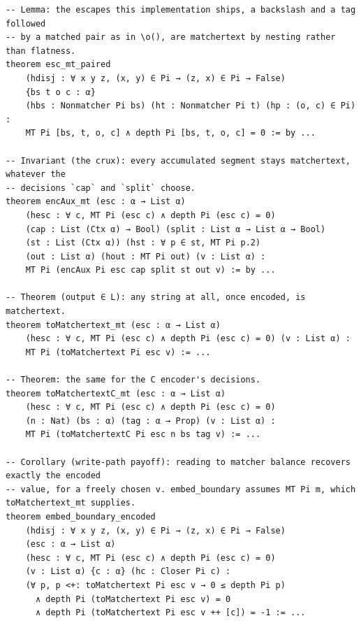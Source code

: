 \begin{lstlisting}
-- Lemma: the escapes this implementation ships, a backslash and a tag followed
-- by a matched pair as in \o(), are matchertext by nesting rather than flatness.
theorem esc_mt_paired
    (hdisj : ∀ x y z, (x, y) ∈ Pi → (z, x) ∈ Pi → False)
    {bs t o c : α}
    (hbs : Nonmatcher Pi bs) (ht : Nonmatcher Pi t) (hp : (o, c) ∈ Pi) :
    MT Pi [bs, t, o, c] ∧ depth Pi [bs, t, o, c] = 0 := by ...

-- Invariant (the crux): every accumulated segment stays matchertext, whatever the
-- decisions `cap` and `split` choose.
theorem encAux_mt (esc : α → List α)
    (hesc : ∀ c, MT Pi (esc c) ∧ depth Pi (esc c) = 0)
    (cap : List (Ctx α) → Bool) (split : List α → List α → Bool)
    (st : List (Ctx α)) (hst : ∀ p ∈ st, MT Pi p.2)
    (out : List α) (hout : MT Pi out) (v : List α) :
    MT Pi (encAux Pi esc cap split st out v) := by ...

-- Theorem (output ∈ L): any string at all, once encoded, is matchertext.
theorem toMatchertext_mt (esc : α → List α)
    (hesc : ∀ c, MT Pi (esc c) ∧ depth Pi (esc c) = 0) (v : List α) :
    MT Pi (toMatchertext Pi esc v) := ...

-- Theorem: the same for the C encoder's decisions.
theorem toMatchertextC_mt (esc : α → List α)
    (hesc : ∀ c, MT Pi (esc c) ∧ depth Pi (esc c) = 0)
    (n : Nat) (bs : α) (tag : α → Prop) (v : List α) :
    MT Pi (toMatchertextC Pi esc n bs tag v) := ...

-- Corollary (write-path payoff): reading to matcher balance recovers exactly the encoded
-- value, for a freely chosen v. embed_boundary assumes MT Pi m, which toMatchertext_mt supplies.
theorem embed_boundary_encoded
    (hdisj : ∀ x y z, (x, y) ∈ Pi → (z, x) ∈ Pi → False)
    (esc : α → List α)
    (hesc : ∀ c, MT Pi (esc c) ∧ depth Pi (esc c) = 0)
    (v : List α) {c : α} (hc : Closer Pi c) :
    (∀ p, p <+: toMatchertext Pi esc v → 0 ≤ depth Pi p)
      ∧ depth Pi (toMatchertext Pi esc v) = 0
      ∧ depth Pi (toMatchertext Pi esc v ++ [c]) = -1 := ...
\end{lstlisting}
